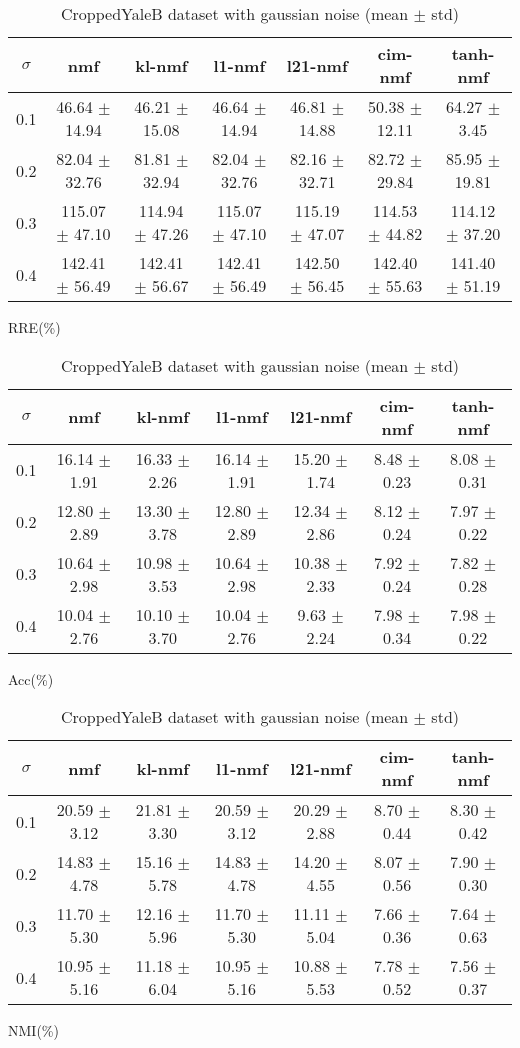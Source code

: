 \documentclass{article} %
\begin{document}
\begin{table}
\begin{subtable}{\linewidth}
\begin{tabular}{c|cccccc}$\sigma$ & nmf & kl-nmf & l1-nmf & l21-nmf & cim-nmf & tanh-nmf \\\hline
0.1 & 46.64 $\pm$ 14.94 & 46.21 $\pm$ 15.08 & 46.64 $\pm$ 14.94 & 46.81 $\pm$ 14.88 & 50.38 $\pm$ 12.11 & 64.27 $\pm$ 3.45 \\
0.2 & 82.04 $\pm$ 32.76 & 81.81 $\pm$ 32.94 & 82.04 $\pm$ 32.76 & 82.16 $\pm$ 32.71 & 82.72 $\pm$ 29.84 & 85.95 $\pm$ 19.81 \\
0.3 & 115.07 $\pm$ 47.10 & 114.94 $\pm$ 47.26 & 115.07 $\pm$ 47.10 & 115.19 $\pm$ 47.07 & 114.53 $\pm$ 44.82 & 114.12 $\pm$ 37.20 \\
0.4 & 142.41 $\pm$ 56.49 & 142.41 $\pm$ 56.67 & 142.41 $\pm$ 56.49 & 142.50 $\pm$ 56.45 & 142.40 $\pm$ 55.63 & 141.40 $\pm$ 51.19 \\
\end{tabular}\caption{RRE(\%)}\end{subtable}
\begin{subtable}{\linewidth}
\begin{tabular}{c|cccccc}$\sigma$ & nmf & kl-nmf & l1-nmf & l21-nmf & cim-nmf & tanh-nmf \\\hline
0.1 & 16.14 $\pm$ 1.91 & 16.33 $\pm$ 2.26 & 16.14 $\pm$ 1.91 & 15.20 $\pm$ 1.74 & 8.48 $\pm$ 0.23 & 8.08 $\pm$ 0.31 \\
0.2 & 12.80 $\pm$ 2.89 & 13.30 $\pm$ 3.78 & 12.80 $\pm$ 2.89 & 12.34 $\pm$ 2.86 & 8.12 $\pm$ 0.24 & 7.97 $\pm$ 0.22 \\
0.3 & 10.64 $\pm$ 2.98 & 10.98 $\pm$ 3.53 & 10.64 $\pm$ 2.98 & 10.38 $\pm$ 2.33 & 7.92 $\pm$ 0.24 & 7.82 $\pm$ 0.28 \\
0.4 & 10.04 $\pm$ 2.76 & 10.10 $\pm$ 3.70 & 10.04 $\pm$ 2.76 & 9.63 $\pm$ 2.24 & 7.98 $\pm$ 0.34 & 7.98 $\pm$ 0.22 \\
\end{tabular}\caption{Acc(\%)}\end{subtable}
\begin{subtable}{\linewidth}
\begin{tabular}{c|cccccc}$\sigma$ & nmf & kl-nmf & l1-nmf & l21-nmf & cim-nmf & tanh-nmf \\\hline
0.1 & 20.59 $\pm$ 3.12 & 21.81 $\pm$ 3.30 & 20.59 $\pm$ 3.12 & 20.29 $\pm$ 2.88 & 8.70 $\pm$ 0.44 & 8.30 $\pm$ 0.42 \\
0.2 & 14.83 $\pm$ 4.78 & 15.16 $\pm$ 5.78 & 14.83 $\pm$ 4.78 & 14.20 $\pm$ 4.55 & 8.07 $\pm$ 0.56 & 7.90 $\pm$ 0.30 \\
0.3 & 11.70 $\pm$ 5.30 & 12.16 $\pm$ 5.96 & 11.70 $\pm$ 5.30 & 11.11 $\pm$ 5.04 & 7.66 $\pm$ 0.36 & 7.64 $\pm$ 0.63 \\
0.4 & 10.95 $\pm$ 5.16 & 11.18 $\pm$ 6.04 & 10.95 $\pm$ 5.16 & 10.88 $\pm$ 5.53 & 7.78 $\pm$ 0.52 & 7.56 $\pm$ 0.37 \\
\end{tabular}\caption{NMI(\%)}\end{subtable}
\caption{CroppedYaleB dataset with gaussian noise (mean $\pm$ std)}
\end{table}
\end{document}

